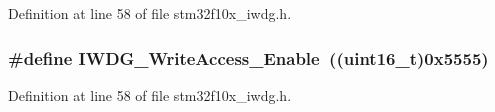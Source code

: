 Definition at line 58 of file stm32f10x\+\_\+iwdg.\+h.

\subsubsection[{\texorpdfstring{I\+W\+D\+G\+\_\+\+Write\+Access\+\_\+\+Enable}{IWDG_WriteAccess_Enable}}]{\setlength{\rightskip}{0pt plus 5cm}\#define I\+W\+D\+G\+\_\+\+Write\+Access\+\_\+\+Enable~(({\bf uint16\+\_\+t})0x5555)}\hypertarget{group___i_w_d_g___write_access_ga86f4b926f4351e19ea069f98c2e65f91}{}\label{group___i_w_d_g___write_access_ga86f4b926f4351e19ea069f98c2e65f91}


Definition at line 58 of file stm32f10x\+\_\+iwdg.\+h.

